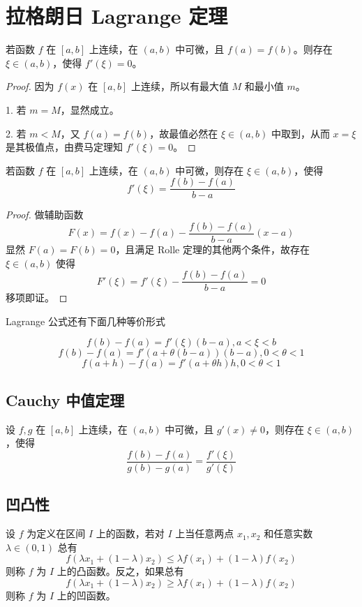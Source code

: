 \section{拉格朗日 Lagrange 定理}

\begin{theorem}
	若函数 $f$ 在 $[a,b]$ 上连续，在 $(a,b)$ 中可微，且 $f(a)=f(b)$。则存在 $\xi\in(a,b)$，使得 $f'(\xi)=0$。
\end{theorem}

\begin{proof}
	因为 $f(x)$ 在 $[a,b]$ 上连续，所以有最大值 $M$ 和最小值 $m$。

	1. 若 $m=M$，显然成立。

	2. 若 $m < M$，又 $f(a) = f(b)$，故最值必然在 $\xi \in (a, b)$ 中取到，从而 $x=\xi$ 是其极值点，由费马定理知 $f'(\xi) = 0$。
\end{proof}

\begin{theorem}
	若函数 $f$ 在 $[a,b]$ 上连续，在 $(a,b)$ 中可微，则存在 $\xi\in(a,b)$，使得
	$$f'(\xi)=\frac{f(b)-f(a)}{b-a}$$
\end{theorem}



\begin{proof}
	做辅助函数
	\[ F(x) = f(x) - f(a) - \frac{f(b) - f(a)}{b - a}(x - a) \]
	显然 $F(a) = F(b) = 0$，且满足 Rolle 定理的其他两个条件，故存在 $\xi \in (a, b)$ 使得
	\[ F'(\xi) = f'(\xi) - \frac{f(b) - f(a)}{b - a} = 0 \]
	移项即证。
\end{proof}

Lagrange 公式还有下面几种等价形式

$$f(b)-f(a) = f'(\xi)(b-a),a<\xi<b$$
$$f(b)-f(a) = f'(a+\theta(b-a))(b-a),0<\theta<1$$
$$f(a+h) - f(a) = f'(a+\theta h)h,0<\theta<1$$

\subsection{Cauchy 中值定理}

\begin{theorem}
	设 $f,g$ 在 $[a,b]$ 上连续，在 $(a,b)$ 中可微，且 $g'(x)\ne 0$，则存在 $\xi\in (a,b)$，使得
	$$\frac{f(b)-f(a)}{g(b)-g(a)} = \frac{f'(\xi)}{g'(\xi)}$$
\end{theorem}

\subsection{凹凸性}

\begin{definition}
	设 $f$ 为定义在区间 $I$ 上的函数，若对 $I$ 上当任意两点 $x_1,x_2$ 和任意实数 $\lambda\in (0,1)$ 总有
	$$f(\lambda x_1+(1-\lambda)x_2) \leqslant \lambda f(x_1)+(1-\lambda)f(x_2)$$
	则称 $f$ 为 $I$ 上的凸函数。反之，如果总有
	$$f(\lambda x_1+(1-\lambda)x_2) \geqslant \lambda f(x_1)+(1-\lambda)f(x_2)$$
	则称 $f$ 为 $I$ 上的凹函数。
\end{definition}

